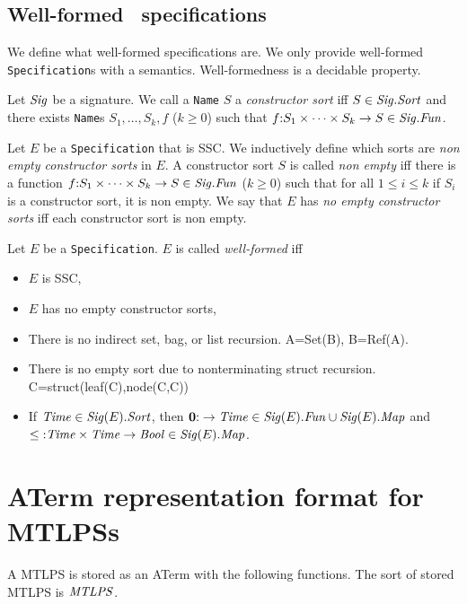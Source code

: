 \documentclass[fleqn,a4paper,dvips]{article}
\newcommand{\Sig}{\nm{Sig}}
\newcommand{\Fun}{\nm{Fun}}
\newcommand{\nul}{{\bf 0}}
\begin{document}
\subsection{Well-formed \mcrl\ specifications}
We define what well-formed specifications are. We only provide
well-formed {\tt Specification}s with a semantics. Well-formedness
is a decidable property.
\begin{defn}
Let $\Sig$ be a signature. We call a {\tt Name} $S$ a {\it constructor sort}
iff $S\in\Sig.\Sort$ and there exists {\tt Name}s $S_1,\ldots, S_k, f$ ($k\geq 0$)
such that $f\ap S_1\times \cdots\times S_k\rightarrow S\in \Sig.\Fun$.
\end{defn}
\begin{defn}
Let $E$ be a {\tt Specification} that is SSC.
We inductively define which sorts are {\it non empty constructor sorts} in $E$.
A constructor sort $S$ is called {\it non empty} iff there is a function
$f\ap S_1\times\cdots\times S_k\rightarrow S\in \Sig.\Fun$ ($k\geq 0$) such
that for all $1\leq i\leq k$ if $S_i$ is a constructor sort, it is non empty.
We say
that $E$ has {\em no empty constructor sorts} iff each constructor sort is non
empty.
\end{defn}
\begin{defn}
Let $E$ be a {\tt Specification}. $E$ is called {\it well-formed} iff
\begin{itemize}
\item $E$ is SSC,
\item $E$ has no empty constructor sorts,
\item There is no indirect set, bag, or list recursion. A=Set(B), B=Ref(A).
\item There is no empty sort due to nonterminating struct recursion.
  C=struct(leaf(C),node(C,C))
\item If $\Time\in\Sig(E).\Sort$, then $\nul\ap \rightarrow\Time\in\Sig(E).\Fun\cup \Sig(E).\Map$
  and $\leq\ap\Time\times\Time\rightarrow\Bool\in \Sig(E).\Map$.
\end{itemize}
\end{defn}

\newpage
\section{ATerm representation format for MTLPSs}
A MTLPS is stored as an ATerm with the following functions. The sort
of stored MTLPS is $\mathit{MTLPS}$.
\end{document}
